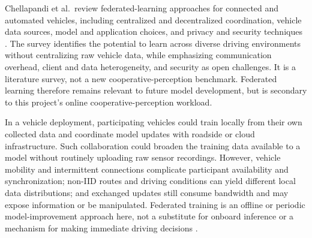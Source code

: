 \documentclass[12pt,a4paper,oneside]{report}
\begin{document}
Chellapandi et al.\ review federated-learning approaches for connected and
automated vehicles, including centralized and decentralized coordination,
vehicle data sources, model and application choices, and privacy and
security techniques \cite{flcav2024}. The survey identifies the potential
to learn across diverse driving environments without centralizing raw
vehicle data, while emphasizing communication overhead, client and data
heterogeneity, and security as open challenges. It is a literature survey,
not a new cooperative-perception benchmark. Federated learning therefore
remains relevant to future model development, but is secondary to this
project's online cooperative-perception workload.

In a vehicle deployment, participating vehicles could train locally from
their own collected data and coordinate model updates with roadside or
cloud infrastructure. Such collaboration could broaden the training data
available to a model without routinely uploading raw sensor recordings.
However, vehicle mobility and intermittent connections complicate
participant availability and synchronization; non-IID routes and driving
conditions can yield different local data distributions; and exchanged
updates still consume bandwidth and may expose information or be
manipulated. Federated training is an offline or periodic model-improvement
approach here, not a substitute for onboard inference or a mechanism for
making immediate driving decisions \cite{deng2020,biswas2023}.
\end{document}
